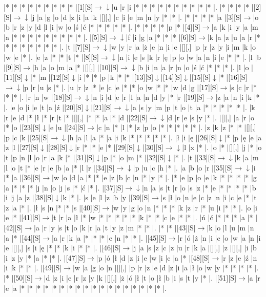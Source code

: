 \documentclass[11pt]{article}
\newcommand\drarr{$\rightarrow \!\!\!\!\! \downarrow$}
\newcommand\rarr{$\rightarrow$}
\newcommand\darr{$\downarrow$}
\begin{document}
\noindent\begin{Puzzle}{22}{31}|*	|*	|*	|*	|*	|*	|*	|*	|*	|[1][S]\drarr	|u	|r	|i	|*	|*	|*	|*	|*	|*	|*	|*	|*	|*	|.
|*	|*	|*	|*	|[2][S]\drarr	|j	|a	|g	|o	|d	|z	|i	|a	|k	|[][,]{ }	|c	|i	|e	|m	|n	|y	|*	|*	|.
|*	|*	|*	|*	|a	|[3][S]\rarr	|o	|b	|r	|z	|y	|d	|l	|i	|w	|o	|ś	|ć	|*	|*	|*	|*	|*	|.
|*	|*	|*	|*	|p	|*	|[4][S]\rarr	|a	|k	|i	|y	|a	|m	|a	|*	|*	|*	|*	|*	|*	|*	|*	|*	|.
|[5][S]\drarr	|f	|i	|g	|a	|*	|*	|*	|[6][S]\rarr	|k	|a	|z	|u	|a	|r	|*	|*	|*	|*	|*	|*	|*	|*	|.
|t	|[7][S]\drarr	|w	|y	|r	|a	|ż	|e	|n	|i	|e	|[][,]{ }	|p	|r	|z	|y	|i	|m	|k	|o	|w	|e	|*	|.
|e	|z	|*	|*	|t	|*	|[8][S]\drarr	|n	|i	|e	|s	|k	|r	|ę	|p	|o	|w	|a	|n	|i	|e	|*	|*	|.
|l	|b	|[9][S]\rarr	|h	|a	|o	|m	|a	|*	|[][,]{ }	|[10][S]\drarr	|b	|i	|n	|a	|r	|n	|o	|ś	|ć	|*	|*	|*	|.
|l	|o	|[11][S]\darr	|*	|m	|[12][S]\darr	|i	|*	|*	|p	|k	|*	|*	|[13][S]\darr	|[14][S]\darr	|[15][S]\darr	|*	|[16][S]\drarr	|p	|r	|u	|s	|*	|.
|u	|r	|z	|*	|e	|c	|e	|*	|*	|o	|w	|*	|*	|w	|d	|g	|[17][S]\rarr	|s	|c	|r	|*	|*	|*	|.
|r	|n	|w	|[18][S]\drarr	|n	|i	|d	|e	|r	|l	|a	|n	|d	|y	|*	|r	|[19][S]\rarr	|z	|a	|n	|i	|k	|*	|.
|e	|o	|i	|e	|t	|a	|ź	|[20][S]\darr	|[21][S]\drarr	|a	|s	|y	|m	|p	|t	|o	|t	|a	|*	|*	|*	|*	|*	|.
|k	|r	|e	|d	|*	|ł	|*	|r	|t	|*	|[][,]{ }	|*	|*	|a	|*	|d	|[22][S]\drarr	|d	|r	|e	|s	|y	|*	|.
|[][,]{ }	|a	|r	|o	|*	|o	|[23][S]\darr	|e	|u	|[24][S]\rarr	|c	|n	|*	|l	|*	|z	|p	|o	|*	|*	|*	|*	|*	|.
|z	|k	|z	|*	|*	|[][,]{ }	|p	|c	|k	|[25][S]\drarr	|h	|a	|l	|a	|*	|a	|i	|k	|*	|*	|*	|*	|*	|.
|ł	|i	|ę	|[26][S]\darr	|*	|p	|ę	|e	|a	|z	|l	|[27][S]\darr	|[28][S]\darr	|r	|*	|*	|e	|*	|[29][S]\darr	|[30][S]\drarr	|l	|x	|*	|.
|o	|*	|[][,]{ }	|j	|*	|o	|t	|p	|n	|l	|o	|r	|a	|k	|*	|[31][S]\darr	|p	|*	|o	|m	|*	|[32][S]\darr	|*	|.
|t	|[33][S]\drarr	|k	|a	|m	|l	|o	|t	|*	|e	|r	|e	|b	|a	|*	|l	|r	|[34][S]\drarr	|p	|u	|c	|h	|*	|.
|a	|b	|o	|r	|[35][S]\drarr	|i	|*	|a	|[36][S]\rarr	|w	|o	|d	|a	|*	|*	|e	|z	|b	|c	|n	|*	|y	|*	|.
|*	|e	|p	|o	|e	|k	|*	|*	|*	|*	|g	|a	|*	|*	|*	|j	|n	|o	|j	|s	|*	|ć	|*	|.
|[37][S]\drarr	|n	|a	|s	|t	|r	|o	|s	|z	|*	|e	|*	|*	|*	|*	|b	|i	|j	|a	|z	|[38][S]\darr	|k	|*	|.
|s	|e	|l	|z	|b	|y	|[39][S]\rarr	|s	|ł	|o	|n	|e	|c	|z	|n	|i	|c	|e	|*	|t	|z	|a	|*	|.
|ł	|s	|n	|*	|*	|s	|[40][S]\rarr	|w	|y	|g	|o	|n	|*	|*	|*	|k	|z	|r	|*	|u	|i	|*	|*	|.
|o	|i	|e	|*	|[41][S]\rarr	|t	|r	|a	|ł	|*	|w	|*	|*	|*	|*	|*	|k	|*	|*	|c	|e	|*	|*	|.
|ń	|ć	|*	|*	|*	|a	|*	|[42][S]\rarr	|a	|r	|y	|s	|t	|o	|k	|r	|a	|t	|y	|z	|m	|*	|*	|.
|*	|*	|[43][S]\rarr	|k	|o	|l	|u	|m	|n	|a	|*	|[44][S]\rarr	|a	|r	|k	|a	|*	|*	|*	|e	|n	|*	|*	|.
|[45][S]\rarr	|r	|ó	|ż	|n	|i	|c	|o	|w	|a	|n	|i	|e	|[][,]{ }	|s	|i	|ę	|*	|*	|k	|i	|*	|*	|.
|[46][S]\rarr	|j	|a	|s	|z	|c	|z	|u	|r	|k	|a	|[][,]{ }	|z	|[][,]{ }	|i	|b	|i	|z	|y	|*	|a	|*	|*	|.
|[47][S]\rarr	|p	|ó	|ł	|d	|z	|i	|e	|w	|i	|c	|a	|*	|[48][S]\rarr	|r	|z	|e	|ź	|n	|i	|k	|*	|*	|.
|[49][S]\rarr	|w	|a	|g	|o	|n	|[][,]{ }	|p	|r	|z	|e	|d	|z	|i	|a	|ł	|o	|w	|y	|*	|*	|*	|*	|.
|*	|[50][S]\rarr	|d	|z	|i	|e	|r	|z	|y	|k	|[][,]{ }	|ż	|ó	|ł	|t	|o	|ł	|b	|i	|s	|t	|y	|*	|.
|[51][S]\rarr	|a	|r	|e	|a	|*	|*	|*	|*	|*	|*	|*	|*	|*	|*	|*	|*	|*	|*	|*	|*	|*	|*	|.\end{Puzzle}
\end{document}
